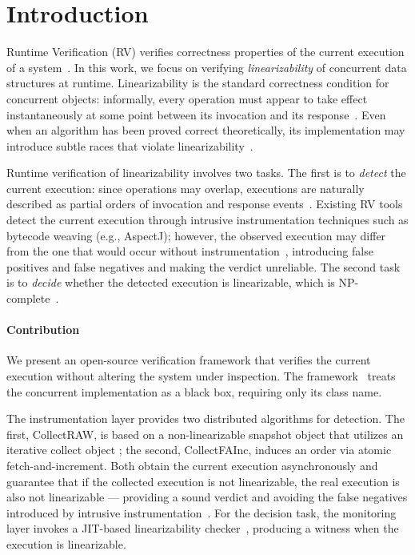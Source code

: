 \documentclass[preprint,12pt]{elsarticle}
\begin{document}
\section{Introduction}

Runtime Verification (RV) verifies correctness properties of the current
execution of a system~\cite{leucker2009}. In this work, we focus on verifying
\emph{linearizability} of concurrent data structures at runtime.
Linearizability is the standard correctness condition for concurrent objects:
informally, every operation must appear to take effect instantaneously at some
point between its invocation and its response~\cite{HW90}. Even when an
algorithm has been proved correct theoretically, its implementation may
introduce subtle races that violate
linearizability~\cite{treiber,discoveringConcurrenterrors}.

Runtime verification of linearizability involves two tasks. The first is to
\emph{detect} the current execution: since operations may overlap, executions
are naturally described as partial orders of invocation and response
events~\cite{HW90}. Existing RV tools detect the current execution through
intrusive instrumentation techniques such as bytecode weaving (e.g., AspectJ);
however, the observed execution may differ from the one that would occur
without instrumentation~\cite{E-HF18}, introducing false positives and false
negatives and making the verdict unreliable. The second task is to
\emph{decide} whether the detected execution is linearizable, which is
NP-complete~\cite{GK97}.

\paragraph{Contribution}

We present an open-source verification framework that verifies the current
execution without altering the system under inspection.
 The framework~\cite{CR25_JACM} treats
the concurrent implementation as a black box, requiring only its class name.

The instrumentation layer provides two distributed algorithms 
for detection. 
The first, CollectRAW, is based on a 
non-linearizable snapshot object that utilizes an 
iterative collect object \cite{RC24}; the second,
 CollectFAInc,  
 induces an order via atomic
fetch-and-increment. Both obtain the current execution asynchronously and
guarantee that if the collected execution is not linearizable, the real
execution is also not linearizable --- providing a sound verdict and avoiding
the false negatives introduced by intrusive instrumentation~\cite{E-HF18}.
For the decision task, the monitoring layer invokes a JIT-based
linearizability checker~\cite{lowe2017}, producing a witness when the
execution is linearizable.
\end{document}
